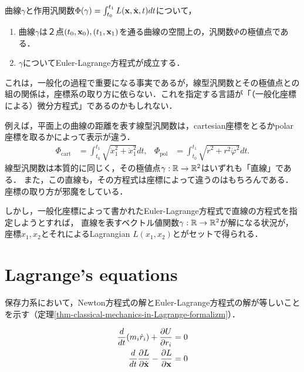 \documentclass[uplatex,dvipdfmx]{jsreport}
\begin{document}
\begin{theorem}
    曲線$\gamma$と作用汎関数$\Phi(\gamma)=\int^{t_1}_{t_0}L(\mathbf{x},\dot{\mathbf{x}},t)dt$について，
    \begin{enumerate}
        \item 曲線$\gamma$は２点$(t_0,\mathbf{x}_0),(t_1,\mathbf{x}_1)$を通る曲線の空間上の，汎関数$\Phi$の極値点である．
        \item $\gamma$についてEuler-Lagrange方程式が成立する．
    \end{enumerate}
\end{theorem}
\begin{remark}\label{remark-generalized-coordinates}
    これは，一般化の過程で重要になる事実であるが，線型汎関数とその極値点との組の関係は，座標系の取り方に依らない．これを指定する言語が「（一般化座標による）微分方程式」であるのかもしれない．

    例えば，平面上の曲線の距離を表す線型汎関数は，cartesian座標をとるかpolar座標を取るかによって表示が違う．
    \begin{align*}
        \Phi_{\mathrm{cart}}&=\int^{t_1}_{t_0}\sqrt{\dot{x}_1^2+\dot{x}_1^2}dt, &\Phi_{\mathrm{pol}}&=\int^{t_1}_{t_0}\sqrt{\dot{r}^2+r^2\dot{\varphi}^2}dt.
    \end{align*}
    線型汎関数は本質的に同じく，その極値点$\gamma:\mathbb{R}\to\mathbb{R}^2$はいずれも「直線」である．
    また，この直線も，その方程式は座標によって違うのはもちろんである．
    座標の取り方が邪魔をしている．

    しかし，一般化座標によって書かれたEuler-Lagrange方程式で直線の方程式を指定しようとすれば，
    直線を表すベクトル値関数$\gamma:\mathbb{R}\to\mathbb{R}^2$が解になる状況が，
    座標$x_1,x_2$とそれによるLagrangian $L(x_1,x_2)$とがセットで得られる．
\end{remark}

\section{Lagrange's equations}

\begin{screen}
    保存力系において，Newton方程式の解とEuler-Lagrange方程式の解が等しいことを示す（定理\ref{thm-classical-mechanics-in-Lagrange-formalizm}）．
\end{screen}

\begin{align}
    \frac{d}{dt}(m_i\dot{r}_i)+\frac{\partial U}{\partial r_i}=0 \label{equation-Newton}\\
    \frac{d}{dt}\frac{\partial L}{\partial\dot{\mathbf{x}}}-\frac{\partial L}{\partial\mathbf{x}}=0 \label{equation-Lagrange}
\end{align}
\end{document}
